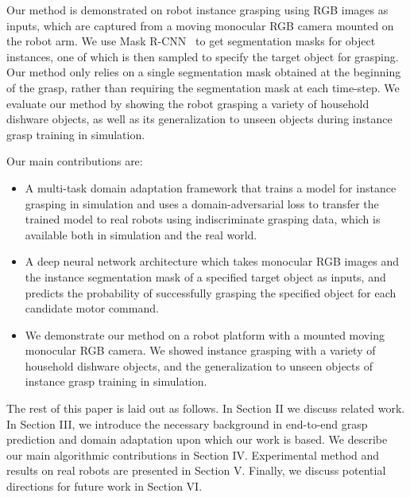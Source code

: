 \documentclass[letterpaper, 10 pt, conference]{ieeeconf}  %
\begin{document}
Our method is demonstrated on robot instance grasping using RGB images as inputs, which are captured from a moving monocular RGB camera mounted on the robot arm. We use Mask R-CNN~\cite{he2017mask} to get segmentation masks for object instances, one of which is then sampled to specify the target object for grasping. Our method only relies on a single segmentation mask obtained at the beginning of the grasp, rather than requiring the segmentation mask at each time-step. We evaluate our method by showing the robot grasping a variety of household dishware objects, as well as its generalization to unseen objects during instance grasp training in simulation.

Our main contributions are:
\begin{itemize}
    \item A multi-task domain adaptation framework that trains a model for instance grasping in simulation and uses a domain-adversarial loss to transfer the trained model to real robots using indiscriminate grasping data, which is available both in simulation and the real world.
    \item A deep neural network architecture which takes monocular RGB images and the instance segmentation mask of a specified target object as inputs, and predicts the probability of successfully grasping the specified object for each candidate motor command.
    \item We demonstrate our method on a robot platform with a mounted moving monocular RGB camera. We showed instance grasping with a variety of household dishware objects, and the generalization to unseen objects of instance grasp training in simulation.
\end{itemize}

The rest of this paper is laid out as follows. In Section II we discuss related work. In Section III, we introduce the necessary background in end-to-end grasp prediction and domain adaptation upon which our work is based. We describe our main algorithmic contributions in Section IV. Experimental method and results on real robots are presented in Section V. Finally, we discuss potential directions for future work in Section VI.
\end{document}
